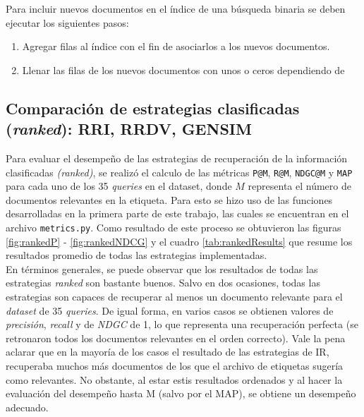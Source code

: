 Para incluir nuevos documentos en el índice de una búsqueda binaria se deben ejecutar los siguientes pasos:

\begin{enumerate}
    \item Agregar filas al índice con el fin de asociarlos a los nuevos documentos.
    \item Llenar las filas de los nuevos documentos con unos o ceros dependiendo de 
\end{enumerate}



\subsection{Comparación de estrategias clasificadas (\textit{ranked}): RRI, RRDV, GENSIM}

Para evaluar el desempeño de las estrategias de recuperación de la información clasificadas \textit{(ranked)}, se realizó el calculo de las métricas \texttt{P@M}, \texttt{R@M}, \texttt{NDGC@M} y \texttt{MAP} para cada uno de los 35 \textit{queries} en el dataset, donde $M$ representa el número de documentos relevantes en la etiqueta. Para esto se hizo uso de las funciones desarrolladas en la primera parte de este trabajo, las cuales se encuentran en el archivo \texttt{metrics.py}. Como resultado de este proceso se obtuvieron las figuras \ref{fig:rankedP} - \ref{fig:rankedNDCG} y el cuadro \ref{tab:rankedResults} que resume los resultados promedio de todas las estrategias implementadas. \\

En términos generales, se puede observar que los resultados de todas las estrategias \textit{ranked} son bastante buenos. Salvo en dos ocasiones, todas las estrategias son capaces de recuperar al menos un documento relevante para el \textit{dataset} de 35 \textit{queries}. De igual forma, en varios casos se obtienen valores de \textit{precisión}, \textit{recall} y de \textit{NDGC} de 1, lo que representa una recuperación perfecta (se retronaron todos los documentos relevantes en el orden correcto). Vale la pena aclarar que en la mayoría de los casos el resultado de las estrategias de IR, recuperaba muchos más documentos de los que el archivo de etiquetas sugería como relevantes. No obstante, al estar estis resultados ordenados y al hacer la evaluación del desempeño hasta M (salvo por el MAP), se obtiene un desempeño adecuado. 

